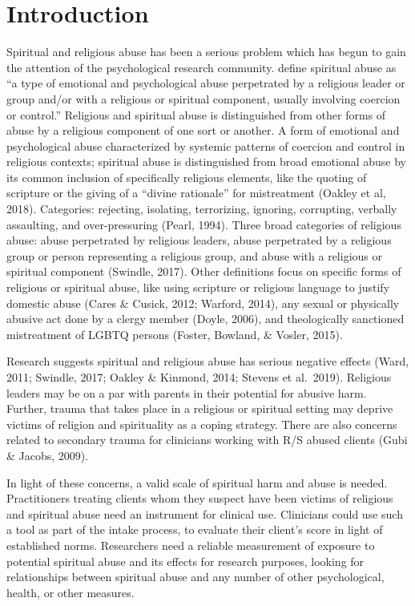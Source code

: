 \documentclass[
]{article}
\begin{document}
\hypertarget{introduction}{%
\section{Introduction}\label{introduction}}

Spiritual and religious abuse has been a serious problem which has begun to gain the attention of the psychological research community. \citet{KochEdstrom2022} define spiritual abuse as ``a type of emotional and psychological abuse perpetrated by a religious leader or group and/or with a religious or spiritual component, usually involving coercion or control.'' Religious and spiritual abuse is distinguished from other forms of abuse by a religious component of one sort or another. A form of emotional and psychological abuse characterized by systemic patterns of coercion and control in religious contexts; spiritual abuse is distinguished from broad emotional abuse by its common inclusion of specifically religious elements, like the quoting of scripture or the giving of a ``divine rationale'' for mistreatment (Oakley et al, 2018). Categories: rejecting, isolating, terrorizing, ignoring, corrupting, verbally assaulting, and over-pressuring (Pearl, 1994). Three broad categories of religious abuse: abuse perpetrated by religious leaders, abuse perpetrated by a religious group or person representing a religious group, and abuse with a religious or spiritual component (Swindle, 2017). Other definitions focus on specific forms of religious or spiritual abuse, like using scripture or religious language to justify domestic abuse (Cares \& Cusick, 2012; Warford, 2014), any sexual or physically abusive act done by a clergy member (Doyle, 2006), and theologically sanctioned mistreatment of LGBTQ persons (Foster, Bowland, \& Vosler, 2015).

Research suggests spiritual and religious abuse has serious negative effects (Ward, 2011; Swindle, 2017; Oakley \& Kinmond, 2014; Stevens et al.~2019). Religious leaders may be on a par with parents in their potential for abusive harm. Further, trauma that takes place in a religious or spiritual setting may deprive victims of religion and spirituality as a coping strategy. There are also concerns related to secondary trauma for clinicians working with R/S abused clients (Gubi \& Jacobs, 2009).

In light of these concerns, a valid scale of spiritual harm and abuse is needed. Practitioners treating clients whom they suspect have been victims of religious and spiritual abuse need an instrument for clinical use. Clinicians could use such a tool as part of the intake process, to evaluate their client's score in light of established norms. Researchers need a reliable measurement of exposure to potential spiritual abuse and its effects for research purposes, looking for relationships between spiritual abuse and any number of other psychological, health, or other measures.
\end{document}
